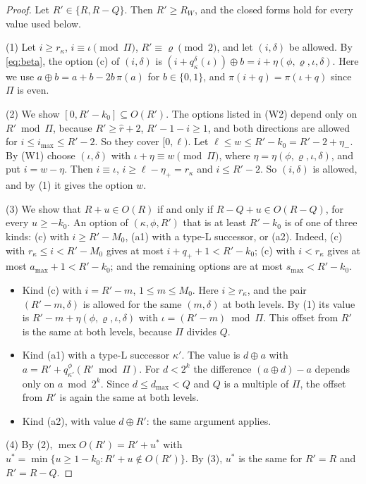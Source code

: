 \documentclass[11pt]{amsart}
\theoremstyle{definition}
\theoremstyle{remark}
\newcommand{\mex}{\operatorname{mex}}
\begin{document}
\begin{proof}
Let $R'\in\{R,R-Q\}$. Then $R'\ge R_W$, and the closed forms hold for every value used below.

(1) Let $i\ge r_\kappa$, $i\equiv\iota\pmod\Pi$, $R'\equiv\varrho\pmod 2$, and let $(i,\delta)$ be allowed. By \eqref{eq:beta}, the option (c) of $(i,\delta)$ is $(i+q^\delta_\kappa(\iota))\oplus b=i+\eta(\phi,\varrho,\iota,\delta)$. Here we use $a\oplus b=a+b-2b\,\pi(a)$ for $b\in\{0,1\}$, and $\pi(i+q)=\pi(\iota+q)$ since $\Pi$ is even.

(2) We show $[0,R'-k_0]\subseteq O(R')$. The options listed in (W2) depend only on $R'\bmod\Pi$, because $R'\ge\hat r+2$, $R'-1-i\ge1$, and both directions are allowed for $i\le i_{\max}\le R'-2$. So they cover $[0,\ell)$. Let $\ell\le w\le R'-k_0=R'-2+\eta_-$. By (W1) choose $(\iota,\delta)$ with $\iota+\eta\equiv w\pmod \Pi$, where $\eta=\eta(\phi,\varrho,\iota,\delta)$, and put $i=w-\eta$. Then $i\equiv\iota$, $i\ge\ell-\eta_+=r_\kappa$ and $i\le R'-2$. So $(i,\delta)$ is allowed, and by (1) it gives the option $w$.

(3) We show that $R+u\in O(R)$ if and only if $R-Q+u\in O(R-Q)$, for every $u\ge-k_0$. An option of $(\kappa,\phi,R')$ that is at least $R'-k_0$ is of one of three kinds: (c) with $i\ge R'-M_0$, (a1) with a type-L successor, or (a2). Indeed, (c) with $r_\kappa\le i<R'-M_0$ gives at most $i+q_++1<R'-k_0$; (c) with $i<r_\kappa$ gives at most $a_{\max}+1<R'-k_0$; and the remaining options are at most $s_{\max}<R'-k_0$.
\begin{itemize}[leftmargin=*]
\item Kind (c) with $i=R'-m$, $1\le m\le M_0$. Here $i\ge r_\kappa$, and the pair $(R'-m,\delta)$ is allowed for the same $(m,\delta)$ at both levels. By (1) its value is $R'-m+\eta(\phi,\varrho,\iota,\delta)$ with $\iota=(R'-m)\bmod\Pi$. This offset from $R'$ is the same at both levels, because $\Pi$ divides $Q$.
\item Kind (a1) with a type-L successor $\kappa'$. The value is $d\oplus a$ with $a=R'+q^\phi_{\kappa'}(R'\bmod\Pi)$. For $d<2^k$ the difference $(a\oplus d)-a$ depends only on $a\bmod 2^k$. Since $d\le d_{\max}<Q$ and $Q$ is a multiple of $\Pi$, the offset from $R'$ is again the same at both levels.
\item Kind (a2), with value $d\oplus R'$: the same argument applies.
\end{itemize}

(4) By (2), $\mex O(R')=R'+u^*$ with $u^*=\min\{u\ge 1-k_0: R'+u\notin O(R')\}$. By (3), $u^*$ is the same for $R'=R$ and $R'=R-Q$.
\end{proof}
\end{document}
